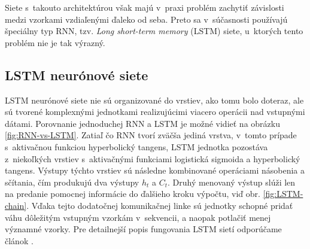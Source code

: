 \noindent Siete s~takouto architektúrou však majú v~praxi problém zachytiť závislosti medzi vzorkami vzdiaľenými ďaleko od seba. Preto sa v~súčasnosti používajú špeciálny typ RNN, tzv. \textit{Long short-term memory} (LSTM) siete, u~ktorých tento problém nie je tak výrazný.

\subsection*{LSTM neurónové siete}

LSTM neurónové siete nie sú organizované do vrstiev, ako tomu bolo doteraz, ale sú tvorené komplexnými jednotkami realizujúcimi viacero operácii nad vstupnými dátami. Porovnanie jednoduchej RNN a LSTM je možné vidieť na obrázku \ref{fig:RNN-vs-LSTM}. Zatiaľ čo RNN tvorí zväčša jediná vrstva, v~tomto prípade s~aktivačnou funkciou hyperbolický tangens, LSTM jednotka pozostáva z~niekoľkých vrstiev s~aktivačnými funkciami logistická sigmoida a hyperbolický tangens. Výstupy týchto vrstiev sú následne kombinované operáciami násobenia a sčítania, čím produkujú dva výstupy $h_t$ a $C_t$. Druhý menovaný výstup slúži len na predanie pomocnej informácie do ďalšieho kroku výpočtu, viď obr. \ref{fig:LSTM-chain}. Vďaka tejto dodatočnej komunikačnej linke sú jednotky schopné pridať váhu dôležitým vstupným vzorkám v~sekvencii, a naopak potlačiť menej významné vzorky. Pre detailnejší popis fungovania LSTM sietí odporúčame článok \cite{Olah2015}.

